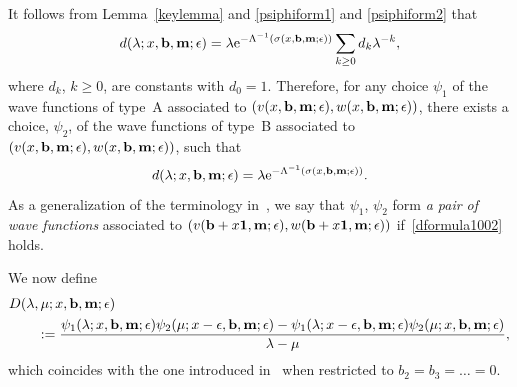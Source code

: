 \documentclass[pdftex]{sigma}
\newcommand{\e}{\epsilon}
\newcommand{\nn}{\nonumber}
\newcommand{\beq}{\begin{equation}}
\newcommand{\eeq}{\end{equation}}
\numberwithin{equation}{section}
\begin{document}
It follows from Lemma~\ref{keylemma} and \eqref{psiphiform1} and \eqref{psiphiform2} that
\[
d(\lambda; x, {\bf b}, {\bf m};\e) = \lambda {\rm e}^{-\Lambda^{-1}(\sigma(x, {\bf b},{\bf m};\e))} \sum_{k\ge0} d_k \lambda^{-k},
\]
where $d_k$, $k\ge0$, are constants with $d_0=1$.
Therefore, for any choice $\psi_1$ of
the wave functions of type~A associated to $(v(x, {\bf b}, {\bf m};\e), w(x, {\bf b}, {\bf m};\e))$, there exists a choice, $\psi_2$, of
the wave functions of type~B associated to $(v(x, {\bf b}, {\bf m};\e), w(x, {\bf b}, {\bf m};\e))$, such that
\beq\label{dformula1002}
d(\lambda; x, {\bf b}, {\bf m};\e) = \lambda {\rm e}^{-\Lambda^{-1}(\sigma(x, {\bf b},{\bf m};\e))}.
\eeq
As a generalization of the terminology in~\cite{Y}, we say that $\psi_1$, $\psi_2$ form {\it a pair of wave functions}
associated to $(v({\bf b}+x{\bf 1}, {\bf m};\e), w({\bf b}+x{\bf 1}, {\bf m};\e))$ if~\eqref{dformula1002} holds.

We now define
\begin{align*}%
&D(\lambda,\mu; x, {\bf b}, {\bf m};\e) \\
&\qquad{}:= \frac{\psi_1(\lambda; x, {\bf b}, {\bf m};\e) \psi_2(\mu; x-\e, {\bf b}, {\bf m};\e)
- \psi_1(\lambda; x-\e, {\bf b}, {\bf m};\e) \psi_2(\mu; x, {\bf b}, {\bf m};\e)}{\lambda-\mu}, \nn
\end{align*}
which coincides with the one introduced in~\cite{Y} when restricted to $b_2=b_3=\dots=0$.
\end{document}
